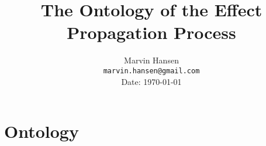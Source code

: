 \documentclass{article}
\title{The Ontology of the Effect Propagation Process}
\author{
  Marvin Hansen \\
  \texttt{marvin.hansen@gmail.com} \\
   Date: \today
}
\begin{document}
\maketitle


\section{Ontology}
\label{sec:ontology}




%  
%  
\end{document}
